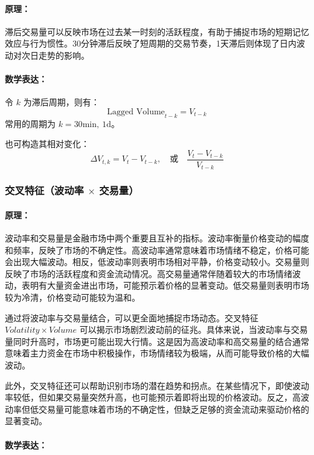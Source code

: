 \documentclass[a4paper,11pt]{ctexart}
\begin{document}
\paragraph{原理：}

滞后交易量可以反映市场在过去某一时刻的活跃程度，有助于捕捉市场的短期记忆效应与行为惯性。30分钟滞后反映了短周期的交易节奏，1天滞后则体现了日内波动对次日走势的影响。

\paragraph{数学表达：}

令 $k$ 为滞后周期，则有：
\[
\text{Lagged Volume}_{t-k} = V_{t-k}
\]
常用的周期为 $k = 30\text{min},\ 1\text{d}$。

也可构造其相对变化：
\[
\Delta V_{t,k} = V_t - V_{t-k}, \quad \text{或} \quad \frac{V_t - V_{t-k}}{V_{t-k}}
\]

\subsubsection{交叉特征（波动率 $\times$ 交易量）}

\paragraph{原理：}

波动率和交易量是金融市场中两个重要且互补的指标。波动率衡量价格变动的幅度和频率，反映了市场的不确定性。高波动率通常意味着市场情绪不稳定，价格可能会出现大幅波动。相反，低波动率则表明市场相对平静，价格变动较小。交易量则反映了市场的活跃程度和资金流动情况。高交易量通常伴随着较大的市场情绪波动，表明有大量资金进出市场，可能预示着价格的显著变动。低交易量则表明市场较为冷清，价格变动可能较为温和。

通过将波动率与交易量结合，可以更全面地捕捉市场动态。交叉特征 ${Volatility \times Volume}$ 可以揭示市场剧烈波动前的征兆。具体来说，当波动率与交易量同时升高时，市场更可能出现大行情。这是因为高波动率和高交易量的结合通常意味着主力资金在市场中积极操作，市场情绪较为极端，从而可能导致价格的大幅波动。

此外，交叉特征还可以帮助识别市场的潜在趋势和拐点。在某些情况下，即使波动率较低，但如果交易量突然升高，也可能预示着即将出现的价格波动。反之，高波动率但低交易量可能意味着市场的不确定性，但缺乏足够的资金流动来驱动价格的显著变动。

\paragraph{数学表达：}
\end{document}
